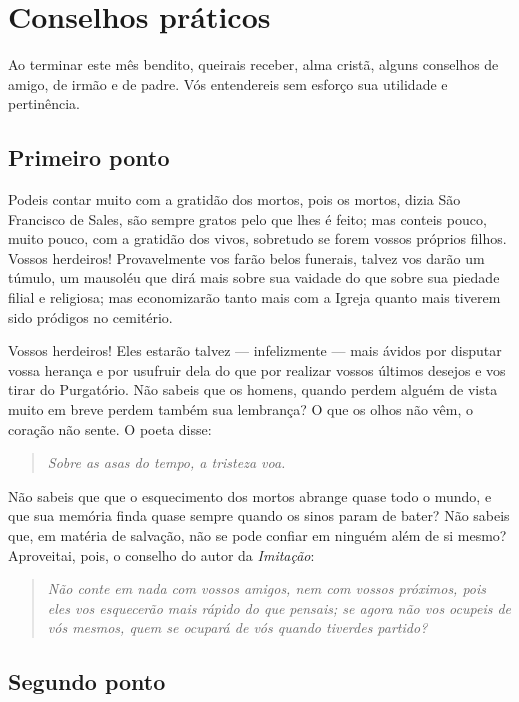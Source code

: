 \renewcommand{\thechapterdisplay}{}
\renewcommand{\thechapterrunner}{Conselhos práticos}
\chapter{Conselhos práticos}
Ao terminar este mês bendito, queirais receber, alma cristã, alguns conselhos de amigo, de irmão e de padre. Vós entendereis sem esforço sua utilidade e pertinência. 

\section*{Primeiro ponto}

Podeis contar muito com a gratidão dos mortos, pois os mortos, dizia São Francisco de Sales, são sempre gratos pelo que lhes é feito; mas conteis pouco, muito pouco, com a gratidão dos vivos, sobretudo se forem vossos próprios filhos. Vossos herdeiros! Provavelmente vos farão belos funerais, talvez vos darão um túmulo, um mausoléu que dirá mais sobre sua vaidade do que sobre sua piedade filial e religiosa; mas economizarão tanto mais com a Igreja quanto mais tiverem sido pródigos no cemitério.

Vossos herdeiros! Eles estarão talvez --- infelizmente --- mais ávidos por disputar vossa herança e por usufruir dela do que por realizar vossos últimos desejos e vos tirar do Purgatório. Não sabeis que os homens, quando perdem alguém de vista muito em breve perdem também sua lembrança? O que os olhos não vêm, o coração não sente. O poeta disse:

\begin{quote}
\textit{\textit{Sobre as asas do tempo, a tristeza voa.}}
\end{quote}

Não sabeis que que o esquecimento dos mortos abrange quase todo o mundo, e que sua memória finda quase sempre quando os sinos param de bater? Não sabeis que, em matéria de salvação, não se pode confiar em ninguém além de si mesmo? Aproveitai, pois, o conselho do autor da \textit{Imitação}:

\begin{quote}
\textit{\textit{Não conte em nada com vossos amigos, nem com vossos próximos, pois eles vos esquecerão mais rápido do que pensais; se agora não vos ocupeis de vós mesmos, quem se ocupará de vós quando tiverdes partido?}}
\end{quote}

\section*{Segundo ponto}

